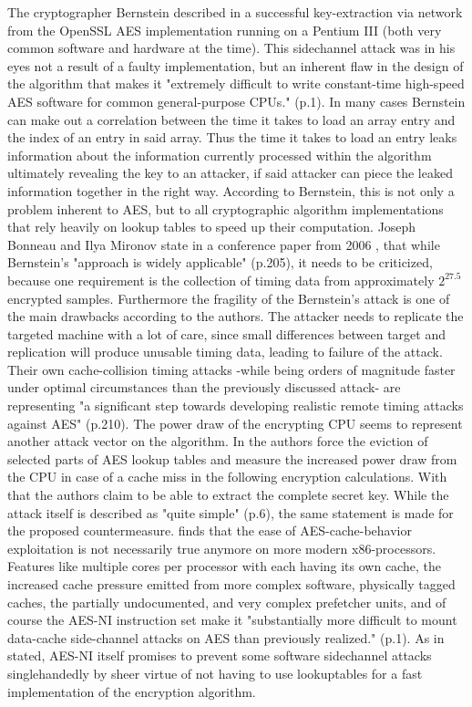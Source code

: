 The cryptographer Bernstein described in \cite{bernsteincache} a successful key-extraction via network from the OpenSSL AES implementation running on a Pentium III (both very common software and hardware at the time). This sidechannel attack was in his eyes not a result of a faulty implementation, but an inherent flaw in the design of the algorithm that makes it "extremely difficult to write constant-time high-speed AES software for common general-purpose CPUs." (p.1). In many cases Bernstein can make out a correlation between the time it takes to load an array entry and the index of an entry in said array. Thus the time it takes to load an entry leaks information about the information currently processed within the algorithm ultimately revealing the key to an attacker, if said attacker can piece the leaked information together in the right way.
According to Bernstein, this is not only a problem inherent to AES, but to all cryptographic algorithm implementations that rely heavily on lookup tables to speed up their computation.
Joseph Bonneau and Ilya Mironov state in a conference paper from 2006  \cite{improvedcache}, that while Bernstein's "approach is widely applicable" (p.205), it needs to be criticized, because one requirement is the collection of timing data from approximately $2^{27.5}$ encrypted samples. Furthermore the fragility of the Bernstein's attack is one of the main drawbacks according to the authors. The attacker needs to replicate the targeted machine with a lot of care, since small differences between target and replication will produce unusable timing data, leading to failure of the attack. Their own cache-collision timing attacks -while being orders of magnitude faster under optimal circumstances than the previously discussed attack- are representing "a significant step towards developing realistic remote timing attacks against AES" (p.210).
The power draw of the encrypting CPU seems to represent another attack vector on the algorithm. In \cite{powerdraw} the authors force the eviction of selected parts of AES lookup tables and measure the increased power draw from the CPU in case of a cache miss in the following encryption calculations. With that the authors claim to be able to extract the complete secret key. While the attack itself is described as "quite simple" (p.6), the same statement is made for the proposed countermeasure.
\cite{ctattacksfeasible} finds that the ease of AES-cache-behavior exploitation is not necessarily true anymore on more modern x86-processors. Features like multiple cores per processor with each having its own cache, the increased cache pressure emitted from more complex software, physically tagged caches, the partially undocumented, and very complex prefetcher units, and of course the AES-NI instruction set make it "substantially more difficult to mount data-cache side-channel attacks on AES than previously realized." (p.1). As in \cite{aes-ni} stated, AES-NI itself promises to prevent some software sidechannel attacks singlehandedly by sheer virtue of not having to use lookuptables for a fast implementation of the encryption algorithm.
